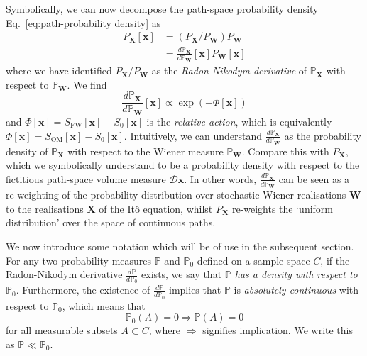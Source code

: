 Symbolically, we can now decompose the path-space probability density Eq.~\ref{eq:path-probability density} as
\begin{equation}
\begin{aligned}
P_\mathbf{X}[\mathbf{x}] & = (P_\mathbf{X} / P_\mathbf{W}) P_\mathbf{W}   \\
 & = \frac{d \mathbb{P}_\mathbf{X}}{d \mathbb{P}_\mathbf{W}}[\mathbf{x}] P_\mathbf{W}[\mathbf{x}]
\end{aligned}
\end{equation}
where we have identified $P_\mathbf{X} / P_\mathbf{W}$ as the \textit{Radon-Nikodym derivative} of $\mathbb{P}_\mathbf{X}$ with respect to $\mathbb{P}_\mathbf{W}$. We find
\begin{equation} \label{eq:radon-nikodym derivative of Px}
\frac{d \mathbb{P}_\mathbf{X}}{d \mathbb{P}_\mathbf{W}}[\mathbf{x}] \propto \exp ( -\Phi[\mathbf{x}] )
\end{equation}
and $\Phi[\mathbf{x}] = S_\text{FW}[\mathbf{x}] - S_0[\mathbf{x}]$ is the \textit{relative action}, which is equivalently $\Phi[\mathbf{x}] = S_\text{OM}[\mathbf{x}] - S_0[\mathbf{x}]$. Intuitively, we can understand $\frac{d \mathbb{P}_\mathbf{X}}{d \mathbb{P}_\mathbf{W}}$ as the probability density of $\mathbb{P}_\mathbf{X}$ with respect to the Wiener measure $\mathbb{P}_\mathbf{W}$. Compare this with $P_\mathbf{X}$, which we symbolically understand to be a probability density with respect to the fictitious path-space volume measure $\mathcal{D} \mathbf{x}$. In other words, $\frac{d \mathbb{P}_\mathbf{X}}{d \mathbb{P}_\mathbf{W}}$ can be seen as a re-weighting of the probability distribution over stochastic Wiener realisations $\mathbf{W}$ to the realisations $\mathbf{X}$ of the It\^{o} equation, whilst $P_\mathbf{X}$ re-weights the `uniform distribution' over the space of continuous paths.

We now introduce some notation which will be of use in the subsequent section. For any two probability measures $\mathbb{P}$ and $\mathbb{P}_0$ defined on a sample space $C$, if the Radon-Nikodym derivative $\frac{d \mathbb{P}}{d \mathbb{P}_0}$ exists, we say that \textit{$\mathbb{P}$ has a density with respect to $\mathbb{P}_0$}. Furthermore, the existence of $\frac{d \mathbb{P}}{d \mathbb{P}_0}$ implies that $\mathbb{P}$ is \textit{absolutely continuous} with respect to $\mathbb{P}_0$, which means that
\begin{equation} \label{eq:absolute continuity}
	\mathbb{P}_0(A) = 0 \Rightarrow \mathbb{P}(A) = 0
\end{equation}
for all measurable subsets $A \subset C$, where $\Rightarrow$ signifies implication. We write this as $\mathbb{P} \ll \mathbb{P}_0$.

